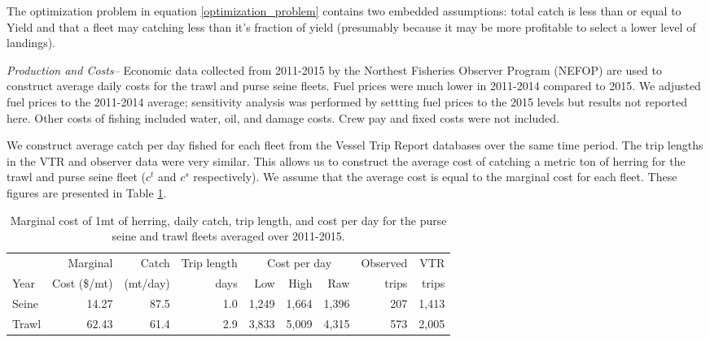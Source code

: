 \documentclass[]{article}
\begin{document}
The optimization problem in equation \ref{optimization_problem} contains
two embedded assumptions: total catch is less than or equal to Yield and
that a fleet may catching less than it's fraction of yield (presumably
because it may be more profitable to select a lower level of landings).

\emph{Production and Costs--} Economic data collected from 2011-2015 by
the Northest Fisheries Observer Program (NEFOP) are used to construct
average daily costs for the trawl and purse seine fleets. Fuel prices
were much lower in 2011-2014 compared to 2015. We adjusted fuel prices
to the 2011-2014 average; sensitivity analysis was performed by settting
fuel prices to the 2015 levels but results not reported here. Other
costs of fishing included water, oil, and damage costs. Crew pay and
fixed costs were not included.

We construct average catch per day fished for each fleet from the Vessel
Trip Report databases over the same time period. The trip lengths in the
VTR and observer data were very similar. This allows us to construct the
average cost of catching a metric ton of herring for the trawl and purse
seine fleet (\(c^t\) and \(c^s\) respectively). We assume that the
average cost is equal to the marginal cost for each fleet. These figures
are presented in Table \ref{costs_combined}.

\begin{table}[htpb]
\begin{centering}
\begin{tabular}{l r r r r r r r r}\hline
    &   Marginal &Catch &   Trip length&\multicolumn{3}{c}{Cost per day}    &   Observed    &   VTR \\
Year    &   Cost (\$/mt)& (mt/day) &days    &   Low &   High    &   Raw &    trips  &    trips  \\\hline
Seine   &   14.27 & 87.5& 1.0&  1,249   &   1,664   &   1,396   &   207 &   1,413   \\
Trawl   &   62.43 & 61.4    &2.9&   3,833   &   5,009   &   4,315   &   573 &   2,005   \\\hline
\end{tabular}
\caption{Marginal cost of 1mt of herring, daily catch, trip length, and cost per day for the purse seine and trawl fleets averaged over 2011-2015. \label{costs_combined}}
\end{centering}
\end{table}
\end{document}
